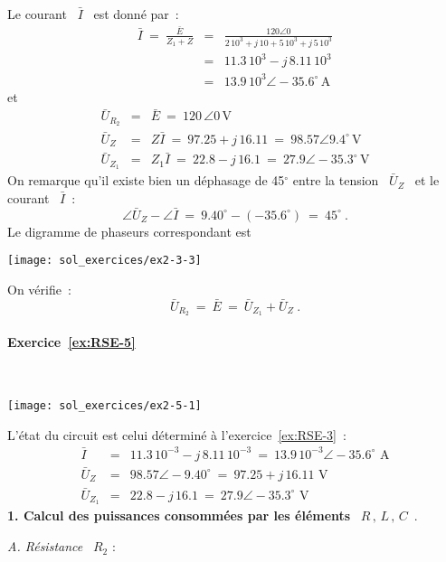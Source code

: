 Le courant \ $\bar{I}$ \ est donné par~:
\begin{eqnarray*}
	\bar{I} \: = \: \frac{\bar{E}}{Z_1 + Z} &=& \frac{120 \angle 0}
	{2\, 10^3 + j\, 10 + 5\, 10^3 + j\, 5\, 10^3}\\
	&=& 11.3\, 10^3 - j\, 8.11 \, 10^3\\
	&=& 13.9\, 10^{3}\angle -35.6^{\circ}\, \text{A}
\end{eqnarray*}
et
\begin{eqnarray*}
	\bar{U}_{R_2} &=& 
	\bar{E} \: = \: 120\,  \angle 0\, \text{V}\\
	\bar{U}_Z &=& 
	Z\bar{I} \: = \: 97.25 + j\, 16.11 \: = \: 98.57  \angle 9.4^{\circ}\, \text{V}\\ 
	\bar{U}_{Z_1} &=& 
	Z_1\bar{I} \: = \: 22.8 - j\, 16.1 \: = \: 27.9  \angle  -35.3^{\circ}\, \text{V}
\end{eqnarray*}
On remarque qu'il existe bien un déphasage de 45$^{\circ}$ entre la
tension \ $\bar{U}_Z$ \ et le courant \ $\bar{I}$~:
\[\angle \bar{U}_Z - \angle \bar{I} 
\: = \: 9.40^{\circ} - (-35.6^{\circ}) \: = \: 45^{\circ}~. \]
Le digramme de phaseurs correspondant est 
\begin{center}
	\texttt{[image: sol\_exercices/ex2-3-3]}
\end{center}

On vérifie~:
\[ \bar{U}_{R_2} \: = \: \bar{E} \: = \: \bar{U}_{Z_1}+ \bar{U}_Z~. \]

\paragraph{Exercice~\ref{ex:RSE-5}}~\\%
\begin{center}
	\texttt{[image: sol\_exercices/ex2-5-1]}
\end{center}
L'état du circuit est celui déterminé à l'exercice~\ref{ex:RSE-3}~:
\begin{eqnarray*}
	\bar{I} &=& 11.3\, 10^{-3} - j\, 8.11 \, 10^{-3} \: = \: 13.9 \, 10^{-3} \angle -35.6^{\circ}\,\,
	\text{A}\\
	\bar{U}_Z &=& 98.57  \angle -9.40^{\circ}\: = \: 97.25 + j\, 16.11 \,\, \text{V}\\
	\bar{U}_{Z_1} &=& 22.8 - j\, 16.1 \: = \: 27.9  \angle -35.3^{\circ} \,\, \text{V}
\end{eqnarray*}
{\bf 1. Calcul des puissances consommées par les éléments}  \ $R\, ,\, L\, ,\, C$~.

{\em A.  Résistance } \ $R_2$ :

